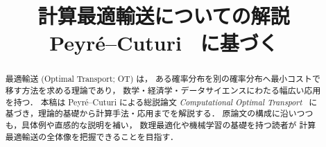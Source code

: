 \documentclass[uplatex, dvipdfmx]{jsreport}
\title{計算最適輸送についての解説\\
\large Peyré--Cuturi~\cite{PeyreCuturi2019} に基づく}
\author{}
\date{}
\begin{document}
\maketitle

\begin{abstract}
最適輸送 (Optimal Transport; OT) は，
ある確率分布を別の確率分布へ最小コストで移す方法を求める理論であり，
数学・経済学・データサイエンスにわたる幅広い応用を持つ．
本稿は Peyré--Cuturi による総説論文
\emph{Computational Optimal Transport}~\cite{PeyreCuturi2019}
に基づき，理論的基礎から計算手法・応用までを解説する．
原論文の構成に沿いつつも，具体例や直感的な説明を補い，
数理最適化や機械学習の基礎を持つ読者が
計算最適輸送の全体像を把握できることを目指す．
\end{abstract}

\tableofcontents














\end{document}
